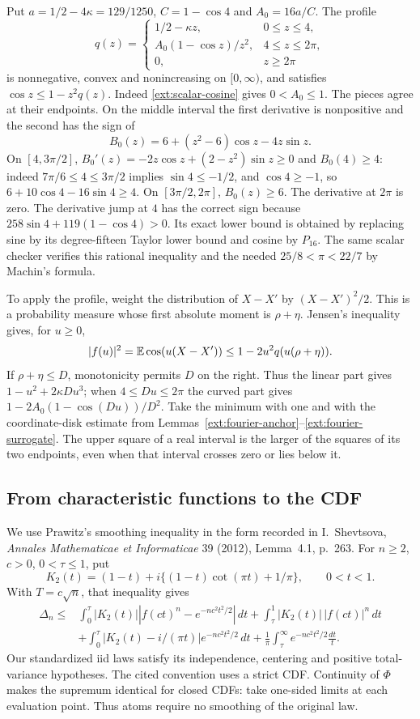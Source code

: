 Put $a=1/2-4\kappa=129/1250$, $C=1-\cos4$ and $A_0=16a/C$.
The profile
\[
 q(z)=\begin{cases}
 1/2-\kappa z,&0\le z\le4,\\
 A_0(1-\cos z)/z^2,&4\le z\le2\pi,\\
 0,&z\ge2\pi
 \end{cases}
\]
is nonnegative, convex and nonincreasing on $[0,\infty)$, and satisfies
$\cos z\le1-z^2q(z)$. Indeed \eqref{ext:scalar-cosine} gives
$0<A_0\le1$. The pieces agree at their endpoints. On the middle interval
the first derivative is nonpositive and the second has the sign of
\[
 B_0(z)=6+(z^2-6)\cos z-4z\sin z.
\]
On $[4,3\pi/2]$, $B_0'(z)=-2z\cos z+(2-z^2)\sin z\ge0$ and
$B_0(4)\ge4$: indeed $7\pi/6\le4\le3\pi/2$ implies
$\sin4\le-1/2$, and $\cos4\ge-1$, so
$6+10\cos4-16\sin4\ge4$. On $[3\pi/2,2\pi]$, $B_0(z)\ge6$.
The derivative at $2\pi$ is zero. The derivative jump at $4$ has the
correct sign because $258\sin4+119(1-\cos4)>0$. Its exact lower bound is
obtained by replacing sine by its degree-fifteen Taylor lower bound and
cosine by $P_{16}$. The same scalar checker verifies this rational
inequality and the needed $25/8<\pi<22/7$ by Machin's formula.

To apply the profile, weight the distribution of $X-X'$ by
$(X-X')^2/2$. This is a probability measure whose first absolute moment
is $\rho+\eta$. Jensen's inequality gives, for $u\ge0$,
\[
 |f(u)|^2=\mathbb E\cos(u(X-X'))
 \le1-2u^2q(u(\rho+\eta)).
\]
If $\rho+\eta\le D$, monotonicity permits $D$ on the right. Thus the
linear part gives $1-u^2+2\kappa Du^3$; when $4\le Du\le2\pi$ the
curved part gives $1-2A_0(1-\cos(Du))/D^2$.
Take the minimum with one and with the coordinate-disk estimate from
Lemmas~\ref{ext:fourier-anchor}--\ref{ext:fourier-surrogate}. The upper
square of a real interval is the larger of the squares of its two
endpoints, even when that interval crosses zero or lies below it.

\subsection{From characteristic functions to the CDF}
\label{ext:finite-fourier-transfer}
We use Prawitz's smoothing inequality in the form recorded in
I.~Shevtsova, \emph{Annales Mathematicae et Informaticae} 39 (2012),
Lemma~4.1, p.~263. For $n\ge2$, $c>0$, $0<\tau\le1$, put
\[
 K_2(t)=(1-t)+i\{(1-t)\cot(\pi t)+1/\pi\},\qquad 0<t<1.
\]
With $T=c\sqrt n$, that inequality gives
\begin{align*}
 \Delta_n\le{}&\int_0^\tau |K_2(t)|
   |f(ct)^n-e^{-nc^2t^2/2}|\,dt
 +\int_\tau^1|K_2(t)|\,|f(ct)|^n\,dt\\
 &+\int_0^\tau|K_2(t)-i/(\pi t)|e^{-nc^2t^2/2}\,dt
 +\frac1\pi\int_\tau^\infty e^{-nc^2t^2/2}\frac{dt}{t}.
\end{align*}
Our standardized iid laws satisfy its independence, centering and positive
total-variance hypotheses. The cited convention uses a strict CDF.
Continuity of $\Phi$ makes the supremum identical for closed CDFs: take
one-sided limits at each evaluation point. Thus atoms require no smoothing
of the original law.

